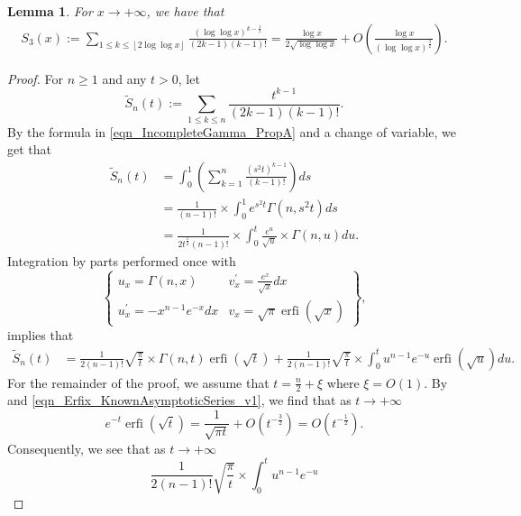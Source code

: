 \documentclass[11pt,reqno,a4letter]{article}
\numberwithin{figure}{section}
\numberwithin{table}{section}
\newcommand{\floor}[1]{\left\lfloor #1 \right\rfloor}
\theoremstyle{plain}
\newtheorem{lemma}[theorem]{Lemma}
\numberwithin{theorem}{section}
\theoremstyle{definition}
\begin{document}
\begin{lemma}
\label{lemma_ConvenientIncGammaFuncTypePartialSumAsymptotics_v3}
For $x \rightarrow +\infty$, we have that 
\begin{align*}
S_3(x) := \sum_{1 \leq k \leq \floor{2\log\log x}} \frac{(\log\log x)^{k-\frac{1}{2}}}{(2k-1) (k-1)!} = 
     \frac{\log x}{2\sqrt{\log\log x}} + O\left(\frac{\log x}{(\log\log x)^{\frac{3}{2}}}\right).       
\end{align*}
\end{lemma}
\begin{proof}
For $n \geq 1$ and any $t > 0$, let 
\[
\widetilde{S}_n(t) := \sum_{1 \leq k \leq n} \frac{t^{k-1}}{(2k-1) (k-1)!}. 
\]
By the formula in \eqref{eqn_IncompleteGamma_PropA} and a change of variable, we get that 
\begin{align*}
\widetilde{S}_n(t) & = \int_0^1 \left(\sum_{k=1}^{n} \frac{(s^2t)^{k-1}}{(k-1)!}\right) ds \\ 
     & = \frac{1}{(n-1)!} \times \int_0^1 e^{s^2t} \Gamma(n, s^2t) ds \\ 
     & = \frac{1}{2t^{\frac{1}{2}}(n-1)!} \times \int_0^{t} \frac{e^{u}}{\sqrt{u}} \times \Gamma(n, u) du. 
\end{align*}
Integration by parts performed once with 
\[
     \left\{\begin{array}{ll} 
     u_x = \Gamma(n, x) & v_x^{\prime} = \frac{e^{x}}{\sqrt{x}} dx \\ 
     u_x^{\prime} = -x^{n-1} e^{-x} dx & v_x = 
     \sqrt{\pi} \operatorname{erfi}\left(\sqrt{x}\right)
     \end{array} 
     \right\}, 
\]
implies that 
\begin{align}
\label{eqn_ProofTag_AppendixLastSumLemma_IBP_resulting_exp_terms_v1}
\widetilde{S}_n(t) & = 
     \frac{1}{2(n-1)!} \sqrt{\frac{\pi}{t}} \times \Gamma(n, t) \operatorname{erfi}\left(
     \sqrt{t}\right) + 
     \frac{1}{2(n-1)!} \sqrt{\frac{\pi}{t}} \times \int_0^{t} u^{n-1} e^{-u} 
     \operatorname{erfi}\left(\sqrt{u}\right) du. 
\end{align}
For the remainder of the proof, we assume that $t = \frac{n}{2} + \xi$ where $\xi = O(1)$. 
By \cite[Eq.\ (7.12.1)]{NISTHB} and \eqref{eqn_Erfix_KnownAsymptoticSeries_v1}, 
we find that as $t \rightarrow +\infty$ 
\[
e^{-t} \operatorname{erfi}\left(\sqrt{t}\right) = 
     \frac{1}{\sqrt{\pi t}} + O\left(t^{-\frac{3}{2}}\right) = 
     O\left(t^{-\frac{1}{2}}\right). 
\]
Consequently, we see that as $t \rightarrow +\infty$ 
\[
\frac{1}{2(n-1)!} \sqrt{\frac{\pi}{t}} \times \int_0^{t} u^{n-1} e^{-u} 
\]
\end{proof}
\end{document}
